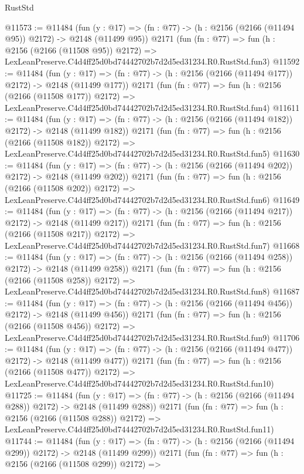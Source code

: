\begin{lexlean}{RustStd}
\begin{coremodule}
@11573 := @11484
    (fun (y : @17) => (fn : @77) -> (h : @2156 (@2166 (@11494 @95)) @2172) -> @2148 (@11499 @95))
    @2171
    (fun (fn : @77) =>
    fun (h : @2156 (@2166 (@11508 @95)) @2172) =>
    LexLeanPreserve.C4d4ff25d0bd74442702b7d2d5ed31234.R0.RustStd.fun3)
@11592 := @11484
    (fun (y : @17) => (fn : @77) -> (h : @2156 (@2166 (@11494 @177)) @2172) -> @2148 (@11499 @177))
    @2171
    (fun (fn : @77) =>
    fun (h : @2156 (@2166 (@11508 @177)) @2172) =>
    LexLeanPreserve.C4d4ff25d0bd74442702b7d2d5ed31234.R0.RustStd.fun4)
@11611 := @11484
    (fun (y : @17) => (fn : @77) -> (h : @2156 (@2166 (@11494 @182)) @2172) -> @2148 (@11499 @182))
    @2171
    (fun (fn : @77) =>
    fun (h : @2156 (@2166 (@11508 @182)) @2172) =>
    LexLeanPreserve.C4d4ff25d0bd74442702b7d2d5ed31234.R0.RustStd.fun5)
@11630 := @11484
    (fun (y : @17) => (fn : @77) -> (h : @2156 (@2166 (@11494 @202)) @2172) -> @2148 (@11499 @202))
    @2171
    (fun (fn : @77) =>
    fun (h : @2156 (@2166 (@11508 @202)) @2172) =>
    LexLeanPreserve.C4d4ff25d0bd74442702b7d2d5ed31234.R0.RustStd.fun6)
@11649 := @11484
    (fun (y : @17) => (fn : @77) -> (h : @2156 (@2166 (@11494 @217)) @2172) -> @2148 (@11499 @217))
    @2171
    (fun (fn : @77) =>
    fun (h : @2156 (@2166 (@11508 @217)) @2172) =>
    LexLeanPreserve.C4d4ff25d0bd74442702b7d2d5ed31234.R0.RustStd.fun7)
@11668 := @11484
    (fun (y : @17) => (fn : @77) -> (h : @2156 (@2166 (@11494 @258)) @2172) -> @2148 (@11499 @258))
    @2171
    (fun (fn : @77) =>
    fun (h : @2156 (@2166 (@11508 @258)) @2172) =>
    LexLeanPreserve.C4d4ff25d0bd74442702b7d2d5ed31234.R0.RustStd.fun8)
@11687 := @11484
    (fun (y : @17) => (fn : @77) -> (h : @2156 (@2166 (@11494 @456)) @2172) -> @2148 (@11499 @456))
    @2171
    (fun (fn : @77) =>
    fun (h : @2156 (@2166 (@11508 @456)) @2172) =>
    LexLeanPreserve.C4d4ff25d0bd74442702b7d2d5ed31234.R0.RustStd.fun9)
@11706 := @11484
    (fun (y : @17) => (fn : @77) -> (h : @2156 (@2166 (@11494 @477)) @2172) -> @2148 (@11499 @477))
    @2171
    (fun (fn : @77) =>
    fun (h : @2156 (@2166 (@11508 @477)) @2172) =>
    LexLeanPreserve.C4d4ff25d0bd74442702b7d2d5ed31234.R0.RustStd.fun10)
@11725 := @11484
    (fun (y : @17) => (fn : @77) -> (h : @2156 (@2166 (@11494 @288)) @2172) -> @2148 (@11499 @288))
    @2171
    (fun (fn : @77) =>
    fun (h : @2156 (@2166 (@11508 @288)) @2172) =>
    LexLeanPreserve.C4d4ff25d0bd74442702b7d2d5ed31234.R0.RustStd.fun11)
@11744 := @11484
    (fun (y : @17) => (fn : @77) -> (h : @2156 (@2166 (@11494 @299)) @2172) -> @2148 (@11499 @299))
    @2171
    (fun (fn : @77) =>
    fun (h : @2156 (@2166 (@11508 @299)) @2172) =>

\end{coremodule}
\end{lexlean}
